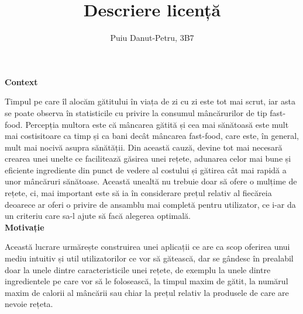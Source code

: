 \documentclass[a4paper,10pt]{article}
\title{Descriere licență}
\author{Puiu Danut-Petru, 3B7}
\date{}
\begin{document}
\maketitle

\medskip

\large
\textbf{Context}\\
\normalsize

Timpul pe care îl alocăm gătitului în viața de zi cu zi este tot mai scrut, iar asta se poate observa în statisticile cu privire la consumul mâncărurilor de tip fast-food.\cite{link1} Percepția multora este că mâncarea gătită și cea mai sănătoasă este mult mai costisitoare ca timp și ca bani decât mâncarea fast-food, care este, în general, mult mai nocivă asupra sănătății.\cite{link2} Din această cauză, devine tot mai necesară crearea unei unelte ce facilitează găsirea unei rețete, adunarea celor mai bune și eficiente ingrediente din punct de vedere al costului și gătirea cât mai rapidă a unor mâncăruri sănătoase. Această unealtă nu trebuie doar să ofere o mulțime de rețete, ci, mai important este să ia în considerare prețul relativ al fiecăreia deoarece ar oferi o privire de ansamblu mai completă pentru utilizator, ce i-ar da  un criteriu care sa-l ajute să facă alegerea optimală.\\

\large
\textbf{Motivație}\\
\normalsize

Această lucrare urmărește construirea unei aplicații ce are ca scop oferirea unui mediu intuitiv și util utilizatorilor ce vor să gătească, dar se gândesc în prealabil doar la unele dintre caracteristicile unei rețete, de exemplu la unele dintre ingredientele pe care vor să le folosească, la timpul maxim de gătit, la numărul maxim de calorii al mâncării sau chiar la prețul relativ la produsele de care are nevoie rețeta.\\

\medskip

\renewcommand{\bibsection}{\subsection*{Bibiliografie}}


\end{document}
